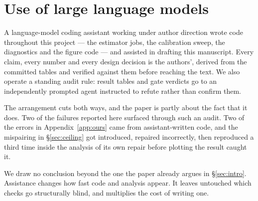 \section*{Use of large language models}
\label{sec:llm}

A language-model coding assistant working under author direction wrote code
throughout this project --- the estimator jobs, the calibration sweep, the
diagnostics and the figure code --- and assisted in drafting this manuscript.
Every claim, every number and every design decision is the authors', derived
from the committed tables and verified against them before reaching the text. We
also operate a standing audit rule: result tables and gate verdicts go to an
independently prompted agent instructed to refute rather than confirm them.

The arrangement cuts both ways, and the paper is partly about the fact that it
does. Two of the failures reported here surfaced through such an audit. Two of
the errors in Appendix~\ref{app:ours} came from assistant-written code, and the
mispairing in \S\ref{sec:ceiling} got introduced, repaired incorrectly, then
reproduced a third time inside the analysis of its own repair before plotting the
result caught it.

We draw no conclusion beyond the one the paper already argues in
\S\ref{sec:intro}. Assistance changes how fast code and analysis appear. It
leaves untouched which checks go structurally blind, and multiplies the cost of
writing one.

